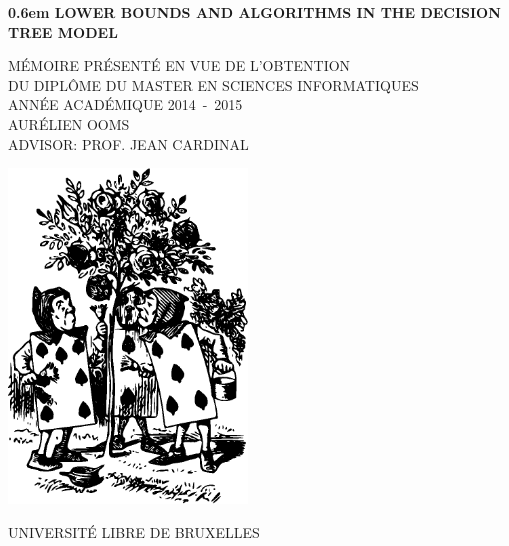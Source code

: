 \documentclass{book}
\begin{document}
\clearpage
\newcommand\nbvspace[1][3]{\vspace*{\stretch{#1}}}
\newcommand\nbstretchyspace{\spaceskip0.5em plus 0.25em minus 0.25em}
\newcommand{\nbtitlestretch}{\spaceskip0.6em}
\pagestyle{empty}
\begin{center}
\bfseries
\nbvspace[1]
\Huge
{\nbtitlestretch\huge
LOWER BOUNDS AND ALGORITHMS IN THE DECISION TREE MODEL}

\nbvspace[1]
\normalsize

MÉMOIRE PRÉSENTÉ EN VUE DE L'OBTENTION\\
DU DIPLÔME DU MASTER EN SCIENCES INFORMATIQUES\\
ANNÉE ACADÉMIQUE 2014~-~2015\\
\nbvspace[1]
\Large AURÉLIEN OOMS\\[0.5em]
\footnotesize ADVISOR: PROF. JEAN CARDINAL

\nbvspace[2]

\includegraphics[width=2.5in]{./cover.eps}
\nbvspace[3]
\normalsize

\large
UNIVERSITÉ LIBRE DE BRUXELLES
\nbvspace[1]
\end{center}
\end{document}
